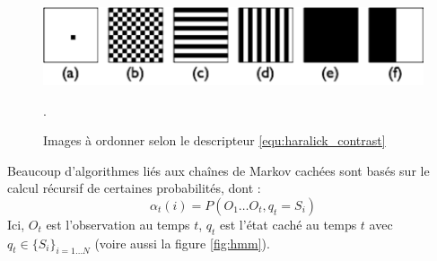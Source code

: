 \documentclass[11pt,addpoints]{exam}
\begin{document}
\begin{questions}
%
%
%
%
\begin{figure}[!ht]
\centering
\includegraphics[scale=0.8]{Haralick_question.pdf}
\caption{Images à ordonner selon le descripteur
  \ref{equ:haralick_contrast} }. 
\label{fig:haralick}
\end{figure}

Beaucoup d'algorithmes liés aux chaînes de Markov cachées sont basés
sur le calcul récursif de certaines probabilités, dont : 
\begin{equation}\label{equ:alpha}
\alpha_t(i) = P(O_1\ldots O_t, q_t=S_i) 
\end{equation}
Ici, $O_t$ est l'observation au temps $t$, $q_t$ est l'état caché au
temps $t$ avec $q_t \in \{S_i\}_{i=1 \ldots N}$ (voire aussi la figure
\ref{fig:hmm}).


\end{questions}
\end{document}
